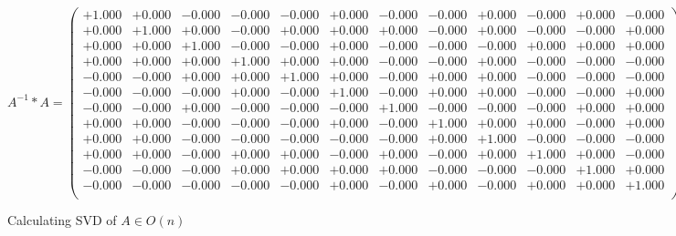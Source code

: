 \documentclass[9pt]{article}
\theoremstyle{plain}
\theoremstyle{definition}
\theoremstyle{remark}
\numberwithin{equation}{section}
\begin{document}
$A^{-1} *A = \left(
\begin{array}{
cccccccccccc}
+1.000 & +0.000 & -0.000 & -0.000 & -0.000 & +0.000 & -0.000 & -0.000 & +0.000 & -0.000 & +0.000 & -0.000 \\
+0.000 & +1.000 & +0.000 & -0.000 & +0.000 & +0.000 & +0.000 & -0.000 & +0.000 & -0.000 & -0.000 & +0.000 \\
+0.000 & +0.000 & +1.000 & -0.000 & -0.000 & +0.000 & -0.000 & -0.000 & -0.000 & +0.000 & +0.000 & +0.000 \\
+0.000 & +0.000 & +0.000 & +1.000 & +0.000 & +0.000 & -0.000 & -0.000 & +0.000 & -0.000 & -0.000 & -0.000 \\
-0.000 & -0.000 & +0.000 & +0.000 & +1.000 & +0.000 & -0.000 & +0.000 & +0.000 & -0.000 & -0.000 & -0.000 \\
-0.000 & -0.000 & -0.000 & +0.000 & -0.000 & +1.000 & -0.000 & +0.000 & +0.000 & -0.000 & -0.000 & +0.000 \\
-0.000 & -0.000 & +0.000 & -0.000 & -0.000 & -0.000 & +1.000 & -0.000 & -0.000 & -0.000 & +0.000 & +0.000 \\
+0.000 & +0.000 & -0.000 & -0.000 & -0.000 & +0.000 & -0.000 & +1.000 & +0.000 & +0.000 & -0.000 & +0.000 \\
+0.000 & +0.000 & -0.000 & -0.000 & -0.000 & -0.000 & -0.000 & +0.000 & +1.000 & -0.000 & -0.000 & -0.000 \\
+0.000 & +0.000 & -0.000 & +0.000 & +0.000 & -0.000 & +0.000 & -0.000 & +0.000 & +1.000 & +0.000 & -0.000 \\
-0.000 & -0.000 & -0.000 & +0.000 & +0.000 & +0.000 & +0.000 & -0.000 & -0.000 & -0.000 & +1.000 & +0.000 \\
-0.000 & -0.000 & -0.000 & -0.000 & -0.000 & +0.000 & -0.000 & +0.000 & -0.000 & +0.000 & +0.000 & +1.000 \\
\end{array}
\right)$ \newline 

Calculating SVD of  $A \in O(n)$
\end{document}
